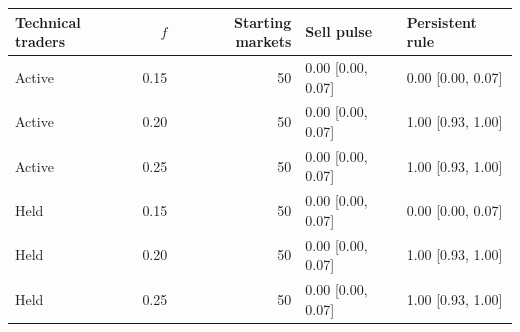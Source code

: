 \begin{center}
\begin{minipage}{\linewidth}\centering
\captionsetup{type=table,hypcap=false}
\caption{A one-time instruction to sell versus a persistent rule switch at the same selected interior traders. Both conditions used dealer depth $h=100$, 3,000 post-intervention steps, and no-switch controls. Entries are majority probabilities with 95\% Wilson intervals.}
\label{tab:revision-pulse}
\small
\begin{tabular}{lrrll}
\toprule
Technical traders & $f$ & Starting markets & Sell pulse & Persistent rule \\
\midrule
Active & 0.15 & 50 & 0.00 [0.00, 0.07] & 0.00 [0.00, 0.07] \\
Active & 0.20 & 50 & 0.00 [0.00, 0.07] & 1.00 [0.93, 1.00] \\
Active & 0.25 & 50 & 0.00 [0.00, 0.07] & 1.00 [0.93, 1.00] \\
Held & 0.15 & 50 & 0.00 [0.00, 0.07] & 0.00 [0.00, 0.07] \\
Held & 0.20 & 50 & 0.00 [0.00, 0.07] & 1.00 [0.93, 1.00] \\
Held & 0.25 & 50 & 0.00 [0.00, 0.07] & 1.00 [0.93, 1.00] \\
\bottomrule
\end{tabular}
\end{minipage}
\end{center}


